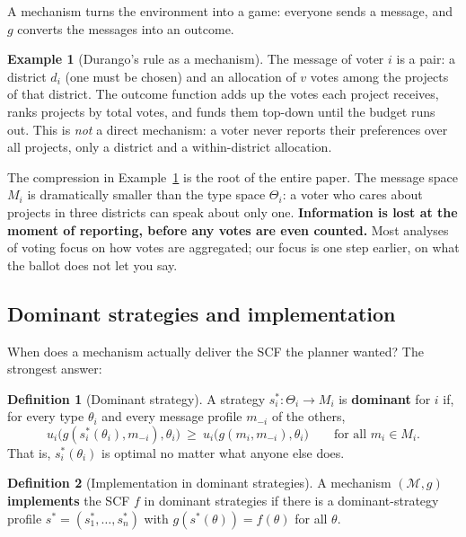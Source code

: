 \documentclass[11pt,letterpaper]{article}
\theoremstyle{definition}
\newtheorem{definition}{Definition}[section]
\newtheorem{example}{Example}[section]
\theoremstyle{plain}
\theoremstyle{remark}
\newcommand{\votes}{v}
\newcommand{\type}{\theta}
\newcommand{\typespace}{\Theta}
\newcommand{\scf}{f}
\begin{document}
A mechanism turns the environment into a game: everyone sends a message, and $g$ converts the
messages into an outcome.

\begin{example}[Durango's rule as a mechanism]
\label{ex:durango}
The message of voter $i$ is a pair: a district $d_i$ (one must be chosen) and an allocation of
$\votes$ votes among the projects of that district. The outcome function adds up the votes each
project receives, ranks projects by total votes, and funds them top-down until the budget runs
out. This is \emph{not} a direct mechanism: a voter never reports their preferences over all
projects, only a district and a within-district allocation.
\end{example}

\begin{watchout}
The compression in Example~\ref{ex:durango} is the root of the entire paper. The message space
$M_i$ is dramatically smaller than the type space $\typespace_i$: a voter who cares about
projects in three districts can speak about only one. \textbf{Information is lost at the moment
of reporting, before any votes are even counted.} Most analyses of voting focus on how votes
are aggregated; our focus is one step earlier, on what the ballot does not let you say.
\end{watchout}

\subsection{Dominant strategies and implementation}

When does a mechanism actually deliver the SCF the planner wanted? The strongest answer:

\begin{definition}[Dominant strategy]
\label{def:dominant}
A strategy $s_i^*:\typespace_i\to M_i$ is \textbf{dominant} for $i$ if, for every type $\type_i$
and every message profile $m_{-i}$ of the others,
\[
  u_i\bigl(g(s_i^*(\type_i),m_{-i}),\type_i\bigr)\ \ge\ u_i\bigl(g(m_i,m_{-i}),\type_i\bigr)
  \qquad\text{for all } m_i\in M_i.
\]
That is, $s_i^*(\type_i)$ is optimal no matter what anyone else does.
\end{definition}

\begin{definition}[Implementation in dominant strategies]
\label{def:implementation}
A mechanism $(\mathcal{M},g)$ \textbf{implements} the SCF $\scf$ in dominant strategies if there
is a dominant-strategy profile $s^*=(s_1^*,\dots,s_n^*)$ with $g(s^*(\type))=\scf(\type)$ for all
$\type$.
\end{definition}
\end{document}
